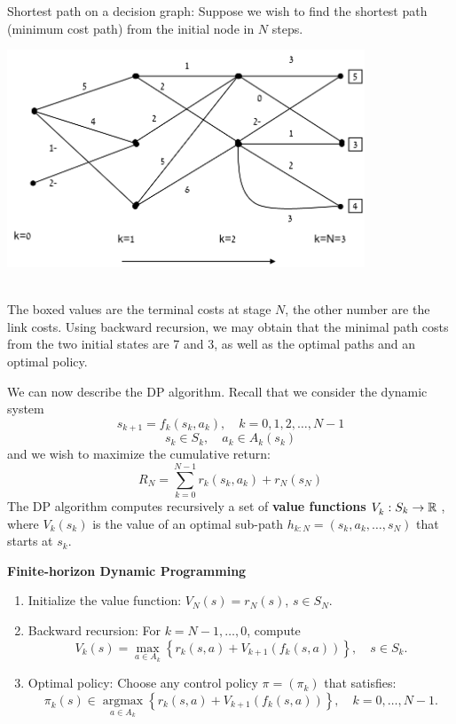 \begin{example} Shortest path on a decision graph:  Suppose we wish to find the shortest path (minimum cost path) from the initial node in $N$ steps.

\begin{centering}
\includegraphics[width=0.8\textwidth]{lecture2_DP}
\end{centering}
\\
The boxed values are the terminal costs at stage $N$, the other number are the link costs.
Using backward recursion, we may obtain that the minimal path costs from the two initial states are 7 and 3, as well as the optimal paths and an optimal policy.

\end{example}

We can now describe the DP algorithm. Recall that we consider the dynamic system
$${s_{k + 1}} = {f_k}({s_k},{a_k}),\quad k = 0,1,2, \ldots ,N - 1$$
$${s_k} \in {S_k},\quad {a_k} \in {A_k}({s_k})$$
and we wish to maximize the cumulative return:
$${R_N} = \sum\limits_{k = 0}^{N - 1} {{r_k}({s_k},{a_k}) + {r_N}({s_N})} $$
The DP algorithm computes recursively a set of \textbf{value functions} $V_k^{}:{S_k} \to \mathbb{R}$ , where $V_k^{}({s_k})$ is the value of an optimal sub-path ${h_{k:N}} = ({s_k},{a_k}, \ldots ,{s_N})$ that starts at ${s_k}$.

\begin{algorithm_}
\textbf{Finite-horizon Dynamic Programming}
\begin{enumerate}
  \item Initialize the value function:   $V_N^{}(s) = {r_N}(s)$,  $s \in {S_N}$.
  \item Backward recursion:  For $k = N - 1, \ldots ,0$, compute
\[V_k^{}(s) = \mathop {\max }\limits_{a \in {A_k}} \left\{ {{r_k}(s,a) + V_{k + 1}^{}({f_k}(s,a))} \right\},\quad     s \in {S_k}.\]
  \item Optimal policy: Choose any control policy $\pi  = ({\pi _k})$ that satisfies:
\[\pi _k^{}(s) \in \mathop {\arg \max }\limits_{a \in {A_k}} \left\{ {{r_k}(s,a) + V_{k + 1}^{}({f_k}(s,a))} \right\},\quad      k = 0, \ldots ,N - 1.\]
\end{enumerate}
\end{algorithm_}

